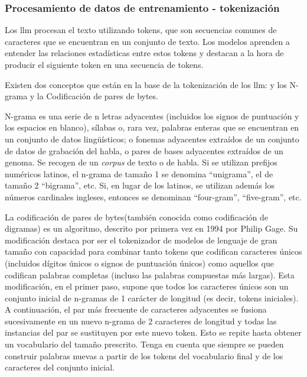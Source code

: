 
\subsubsection{Procesamiento de datos de entrenamiento - tokenización}

Los \acrlong{llm} procesan el texto utilizando tokens, que son secuencias comunes de caracteres que se encuentran en un conjunto de texto. Los modelos aprenden a entender las relaciones estadísticas entre estos tokens y destacan a la hora de producir el siguiente token en una secuencia de tokens\cite{OpenAI_Tokenizer}.


Existen dos conceptos que están en la base de la tokenización de los \acrshort{llm}: y los N-grama y la Codificación de pares de bytes.

N-grama es una serie de n letras adyacentes (incluidos los signos de puntuación y los espacios en blanco), sílabas o, rara vez, palabras enteras que se encuentran en un conjunto de datos lingüísticos; o fonemas adyacentes extraídos de un conjunto de datos de grabación del habla, o pares de bases adyacentes extraídos de un genoma. Se recogen de un \textit{corpus} de texto o de habla. Si se utilizan prefijos numéricos latinos, el n-grama de tamaño 1 se denomina ``unigrama'', el de tamaño 2 ``bigrama'', etc. Si, en lugar de los latinos, se utilizan además los números cardinales ingleses, entonces se denominan ``four-gram'', ``five-gram'', etc. 

La codificación de pares de bytes(también conocida como codificación de digramas) es un algoritmo, descrito por primera vez en 1994 por Philip Gage\cite{Gage_Compresion}. Su modificación destaca por ser el tokenizador de modelos de lenguaje de gran tamaño con capacidad para combinar tanto tokens que codifican caracteres únicos (incluidos dígitos únicos o signos de puntuación únicos) como aquellos que codifican palabras completas (incluso las palabras compuestas más largas). Esta modificación, en el primer paso, supone que todos los caracteres únicos son un conjunto inicial de n-gramas de 1 carácter de longitud (es decir, tokens iniciales). A continuación, el par más frecuente de caracteres adyacentes se fusiona sucesivamente en un nuevo n-grama de 2 caracteres de longitud y todas las instancias del par se sustituyen por este nuevo token. Esto se repite hasta obtener un vocabulario del tamaño prescrito. Tenga en cuenta que siempre se pueden construir palabras nuevas a partir de los tokens del vocabulario final y de los caracteres del conjunto inicial.

